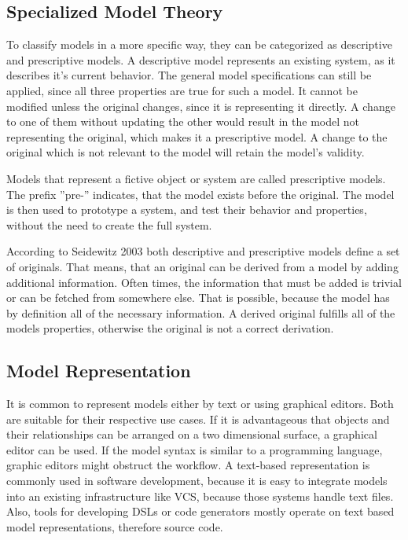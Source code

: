 \subsection{Specialized Model Theory}

To classify models in a more specific way, they can be categorized as descriptive and prescriptive models.
A descriptive model represents an existing system, as it describes it's current behavior.
The general model specifications can still be applied, since all three properties are true for such a model.
It cannot be modified unless the original changes, since it is representing it directly.
A change to one of them without updating the other would result in the model not representing the original, which makes it a prescriptive model.
A change to the original which is not relevant to the model will retain the model's validity.

Models that represent a fictive object or system are called prescriptive models.
The prefix ''pre-'' indicates, that the model exists before the original.
The model is then used to prototype a system, and test their behavior and properties, without the need to create the full system.

According to Seidewitz 2003 \cite{seidewitz_what_2003} both descriptive and prescriptive models define a set of originals.
That means, that an original can be derived from a model by adding additional information.
Often times, the information that must be added is trivial or can be fetched from somewhere else.
That is possible, because the model has by definition all of the necessary information.
A derived original fulfills all of the models properties, otherwise the original is not a correct derivation.

\subsection{Model Representation}

It is common to represent models either by text or using graphical editors.
Both are suitable for their respective use cases.
If it is advantageous that objects and their relationships can be arranged on a two dimensional surface, a graphical editor can be used.
If the model syntax is similar to a programming language, graphic editors might obstruct the workflow.
A text-based representation is commonly used in software development, because it is easy to integrate models into an existing infrastructure like \ac{VCS}, because those systems handle text files.
Also, tools for developing \acp{DSL} or code generators mostly operate on text based model representations, therefore source code.

